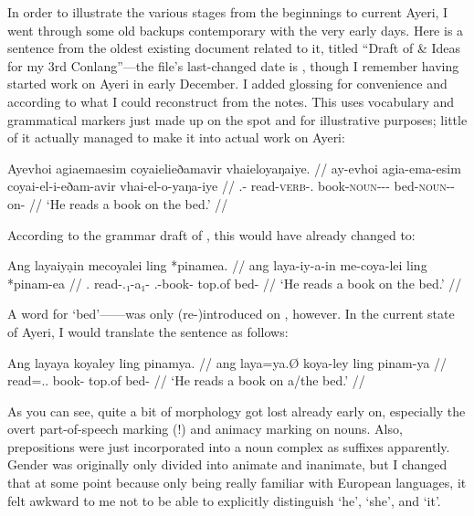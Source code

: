 In order to illustrate the various stages from the beginnings to current Ayeri,
I went through some old backups contemporary with the very early days. 
Here is a sentence from the oldest existing document related to it, titled 
``Draft of \& Ideas for my 3rd Conlang''---the file's last-changed date is 
, though I remember having started work on Ayeri in early 
December. I added glossing for convenience and according to what I could 
reconstruct from the notes. This uses vocabulary and grammatical markers just 
made up on the spot and for illustrative purposes; little of it actually 
managed to make it into actual work on Ayeri:

\ex\begingl
	\gla Ayevhoi agiaemaesim coyaielieðamavir vhaieloyaŋaiye. //
	\glb ay-evhoi agia-ema-esim coyai-el-i-eðam-avir vhai-el-o-yaŋa-iye //
	\glc \Tsg{}.\An{}-\Sbj{} read-\textsc{verb}-\Sbj{}.\An{} 
		book-\textsc{noun}-\An{}-\Indf{}-\Parg{} 
		bed-\textsc{noun}-\Inan{}-on-\Loc{} //
	\glft `He reads a book on the bed.' //
\endgl\xe

According to the grammar draft of , this would have already
changed to:

\ex\begingl
	\gla Ang layaiyạin mecoyalei ling *pinamea. //
	\glb ang laya-iy-a-in me-coya-lei ling *pinam-ea //
	\glc \Aarg{}.\Sbj{} read-\Tsg{}.\An{}₁-a₁-\Sbj{} 
		\Indf{}.\Inan{}-book-\PargI{} top.of bed-\Loc{} //
	\glft `He reads a book on the bed.' //
\endgl\xe

A word for `bed'------was only (re-)introduced on
, however. In the current state of Ayeri, I would 
translate the sentence as follows:

\ex\begingl
	\gla Ang layaya koyaley ling pinamya. //
	\glb ang laya=ya.Ø koya-ley ling pinam-ya //
	\glc \AgtT{} read=\Tsg{}.\M{}.\Top{} book-\PargI{} top.of bed-\Loc{} //
	\glft `He reads a book on a/the bed.' //
\endgl\xe

As you can see, quite a bit of morphology got lost already early on, especially
the overt part-of-speech marking (!) and animacy marking on nouns. Also,
prepositions were just incorporated into a noun complex as suffixes apparently.
Gender was originally only divided into animate and inanimate, but I changed
that at some point because only being really familiar with European languages,
it felt awkward to me not to be able to explicitly distinguish `he', `she', and
`it'.

